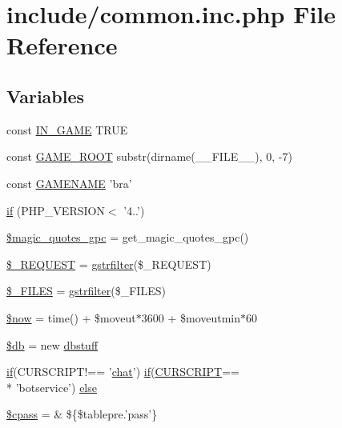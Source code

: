 \hypertarget{common_8inc_8php}{\section{include/common.inc.\+php File Reference}
\label{common_8inc_8php}
}
\subsection*{Variables}
\begin{DoxyCompactItemize}
\item 
const \hyperlink{common_8inc_8php_a12c82f3d28569a3f80804f1e72cef14c}{I\+N\+\_\+\+G\+A\+M\+E} T\+R\+U\+E
\item 
const \hyperlink{common_8inc_8php_a8e43cd27c8e744fff590983bc396aba3}{G\+A\+M\+E\+\_\+\+R\+O\+O\+T} substr(dirname(\+\_\+\+\_\+\+F\+I\+L\+E\+\_\+\+\_\+), 0, -\/7)
\item 
const \hyperlink{common_8inc_8php_a3cd7223880b2f6a1d0bcb325ce43c606}{G\+A\+M\+E\+N\+A\+M\+E} 'bra'
\item 
\hyperlink{common_8inc_8php_a4ac1118c2e44c513a674bc1793ba6c90}{if} (P\+H\+P\+\_\+\+V\+E\+R\+S\+I\+O\+N$<$  '4..')
\item 
\hyperlink{common_8inc_8php_a3bf6a6f8faa278d5cceb69655ecdb782}{\$magic\+\_\+quotes\+\_\+gpc} = get\+\_\+magic\+\_\+quotes\+\_\+gpc()
\item 
\hyperlink{common_8inc_8php_a0e4b7f3b6c609258c08660a1ec52b89b}{\$\+\_\+\+R\+E\+Q\+U\+E\+S\+T} = \hyperlink{global_8func_8php_a2b7ece9137321f3300ce816cab600087}{gstrfilter}(\$\+\_\+\+R\+E\+Q\+U\+E\+S\+T)
\item 
\hyperlink{common_8inc_8php_a797c40bb61689e5072487a9a8d66843c}{\$\+\_\+\+F\+I\+L\+E\+S} = \hyperlink{global_8func_8php_a2b7ece9137321f3300ce816cab600087}{gstrfilter}(\$\+\_\+\+F\+I\+L\+E\+S)
\item 
\hyperlink{common_8inc_8php_af1d5ccdee975b8f4d20aaffc5b28557c}{\$now} = time() + \$moveut$\ast$3600 + \$moveutmin$\ast$60
\item 
\hyperlink{common_8inc_8php_a1fa3127fc82f96b1436d871ef02be319}{\$db} = new \hyperlink{classdbstuff}{dbstuff}
\item 
\hyperlink{login__old_8php_a4ac1118c2e44c513a674bc1793ba6c90}{if}(C\+U\+R\+S\+C\+R\+I\+P\+T!== '\hyperlink{game20130526_8js_aa57ded7cb1d22494c754d847f821e5cf}{chat}') \hyperlink{login__old_8php_a4ac1118c2e44c513a674bc1793ba6c90}{if}(\hyperlink{winner_8php_a39c39f525eceb86cabc338804f230e80}{C\+U\+R\+S\+C\+R\+I\+P\+T}== \\*
'botservice') \hyperlink{common_8inc_8php_aa917bbe088c28b1850023f42d190b240}{else}
\item 
\hyperlink{common_8inc_8php_a6b49904a5083a3eee734e64e8a57e763}{\$cpass} = \& \$\{\$tablepre.'pass'\}
\end{DoxyCompactItemize}


